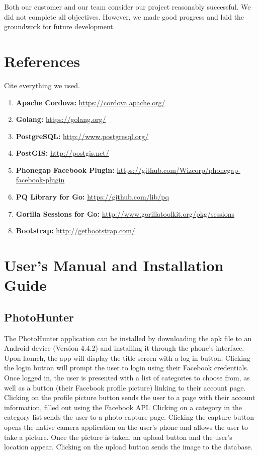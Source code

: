 \documentclass{article}
\begin{document}
Both our customer and our team consider our project reasonably successful. We
did not complete all objectives. However, we made good progress and laid the
groundwork for future development.

\section{References}
Cite everything we used.
\begin{enumerate}

\item \textbf{Apache Cordova:} \url{https://cordova.apache.org/}
\item \textbf{Golang:} \url{https://golang.org/}
\item \textbf{PostgreSQL:} \url{http://www.postgresql.org/}
\item \textbf{PostGIS:} \url{http://postgis.net/}
\item \textbf{Phonegap Facebook Plugin:} \url{https://github.com/Wizcorp/phonegap-facebook-plugin}
\item \textbf{PQ Library for Go:} \url{https://github.com/lib/pq}
\item \textbf{Gorilla Sessions for Go:} \url{http://www.gorillatoolkit.org/pkg/sessions}
\item \textbf{Bootstrap:} \url{http://getbootstrap.com/}

\end{enumerate}

\section{User's Manual and Installation Guide}
\subsection{PhotoHunter}
The PhotoHunter application can be installed by downloading the apk file to an
Android device (Version 4.4.2) and installing it through the phone's interface.
Upon launch, the app will display the title screen with a log in button.
Clicking the login button will prompt the user to login using their Facebook
credentials.  Once logged in, the user is presented with a list of categories
to choose from, as well as a button (their Facebook profile picture) linking to
their account page.  Clicking on the profile picture button sends the user to a
page with their account information, filled out using the Facebook API.
Clicking on a category in the category list sends the user to a photo capture
page.  Clicking the capture button opens the native camera application on the
user's phone and allows the user to take a picture.  Once the picture is taken,
an upload button and the user's location appear.  Clicking on the upload button
sends the image to the database.
\end{document}
